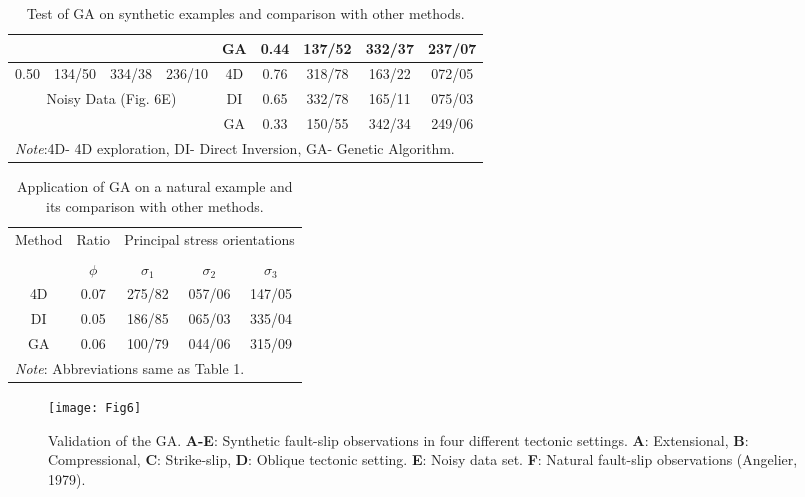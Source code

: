 \begin{table}[H]
\begin{tabular}{@{}ccccccccc@{}}
    \multicolumn{4}{c}{ } & GA & 0.44 & 137/52 & 332/37 & 237/07 \\
    \midrule

     0.50 & 134/50 & 334/38 & 236/10 & 4D & 0.76 & 318/78 & 163/22 & 072/05 \\
    
    \multicolumn{4}{c}{ Noisy Data (Fig. 6E)} & DI & 0.65 & 332/78 & 165/11 & 075/03 \\
     
    \multicolumn{4}{c}{ } & GA & 0.33 & 150/55 & 342/34 & 249/06 \\
    \midrule
    \multicolumn{9}{l}{\textit{Note}:4D- 4D exploration, DI- Direct Inversion, GA- Genetic Algorithm.}
    \bottomrule
  \end{tabular}
  \caption{Test of GA on synthetic examples and comparison with other methods.}\label{table:1}
\end{table}

\begin{table}[H]
  \footnotesize
  \centering
  \begin{tabular}{@{}ccccc@{}}
    \toprule
    Method & Ratio & \multicolumn{3}{c}{Principal stress orientations}\\
    \cmidrule(lr){2-5} \\
     &  $\phi$ & $\sigma_1$ & $\sigma_2$ & $\sigma_3$ \\
    \midrule
    
    4D & 0.07 & 275/82 & 057/06 & 147/05 \\
    DI & 0.05 & 186/85 & 065/03 & 335/04 \\
    GA & 0.06 & 100/79 & 044/06 & 315/09 \\
    
    \midrule
    \multicolumn{5}{l}{\textit{Note}: Abbreviations same as Table 1.}
    \bottomrule
  \end{tabular}
  \caption{Application of GA on a natural example and its comparison with other methods.}\label{table:2}
\end{table}

\begin{figure}[H]
\texttt{[image: Fig6]}
\caption{Validation of the GA. \textbf{A-E}: Synthetic fault-slip observations in four different tectonic settings. \textbf{A}: Extensional, \textbf{B}: Compressional, \textbf{C}: Strike-slip, \textbf{D}: Oblique tectonic setting. \textbf{E}: Noisy data set. \textbf{F}: Natural fault-slip observations (Angelier, 1979).}
\label{fig6}
\end{figure}
